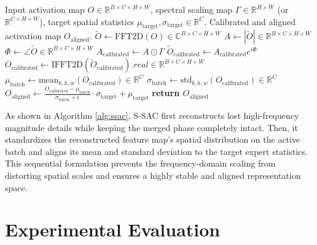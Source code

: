 \documentclass{article}
\theoremstyle{plain}
\theoremstyle{definition}
\theoremstyle{remark}
\begin{document}
\begin{algorithm}[tb]
\caption{Spectral-Spatial Activation Calibration (S-SAC / SMAC)}
\label{alg:ssac}
\begin{algorithmic}[1]
 Input activation map $O \in \mathbb{R}^{B \times C \times H \times W}$, spectral scaling map $\Gamma \in \mathbb{R}^{H \times W}$ (or $\mathbb{R}^{C \times H \times W}$), target spatial statistics $\mu_{\text{target}}, \sigma_{\text{target}} \in \mathbb{R}^C$.
 Calibrated and aligned activation map $O_{\text{aligned}}$.
\STATE {}
\STATE $\tilde{O} \leftarrow \text{FFT2D}(O) \in \mathbb{C}^{B \times C \times H \times W}$
\STATE $A \leftarrow |\tilde{O}| \in \mathbb{R}^{B \times C \times H \times W}$ \hfill{}
\STATE $\Phi \leftarrow \angle\tilde{O} \in \mathbb{R}^{B \times C \times H \times W}$ \hfill{}
\STATE $A_{\text{calibrated}} \leftarrow A \odot \Gamma$ \hfill{}
\STATE $\tilde{O}_{\text{calibrated}} \leftarrow A_{\text{calibrated}} e^{i\Phi}$ \hfill{}
\STATE $O_{\text{calibrated}} \leftarrow \text{IFFT2D}(\tilde{O}_{\text{calibrated}}).real \in \mathbb{R}^{B \times C \times H \times W}$
\STATE {}
\STATE $\mu_{\text{batch}} \leftarrow \text{mean}_{b,h,w}(O_{\text{calibrated}}) \in \mathbb{R}^C$
\STATE $\sigma_{\text{batch}} \leftarrow \text{std}_{b,h,w}(O_{\text{calibrated}}) \in \mathbb{R}^C$
\STATE $O_{\text{aligned}} \leftarrow \frac{O_{\text{calibrated}} - \mu_{\text{batch}}}{\sigma_{\text{batch}} + \epsilon} \cdot \sigma_{\text{target}} + \mu_{\text{target}}$
\STATE \bf{return} $O_{\text{aligned}}$
\end{algorithmic}
\end{algorithm}

As shown in Algorithm \ref{alg:ssac}, S-SAC first reconstructs lost high-frequency magnitude details while keeping the merged phase completely intact. Then, it standardizes the reconstructed feature map's spatial distribution on the active batch and aligns its mean and standard deviation to the target expert statistics. This sequential formulation prevents the frequency-domain scaling from distorting spatial scales and ensures a highly stable and aligned representation space.

\section{Experimental Evaluation}
\label{sec:experiments}
\end{document}

